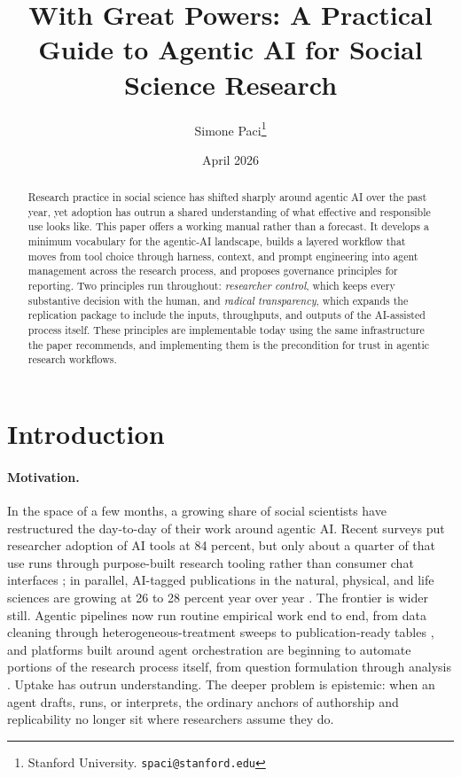 \documentclass[11pt]{article}
\title{With Great Powers: A Practical Guide to Agentic AI for Social Science Research}
\author{Simone Paci\thanks{Stanford University. \texttt{spaci@stanford.edu}}}
\date{April 2026}
\begin{document}
\maketitle

\begin{abstract}
Research practice in social science has shifted sharply around agentic AI over the past year, yet adoption has outrun a shared understanding of what effective and responsible use looks like. This paper offers a working manual rather than a forecast. It develops a minimum vocabulary for the agentic-AI landscape, builds a layered workflow that moves from tool choice through harness, context, and prompt engineering into agent management across the research process, and proposes governance principles for reporting. Two principles run throughout: \emph{researcher control}, which keeps every substantive decision with the human, and \emph{radical transparency}, which expands the replication package to include the inputs, throughputs, and outputs of the AI-assisted process itself. These principles are implementable today using the same infrastructure the paper recommends, and implementing them is the precondition for trust in agentic research workflows.
\end{abstract}

\section{Introduction}
\label{sec:intro}

\paragraph{Motivation.}
In the space of a few months, a growing share of social scientists have restructured the day-to-day of their work around agentic AI. Recent surveys put researcher adoption of AI tools at 84 percent, but only about a quarter of that use runs through purpose-built research tooling rather than consumer chat interfaces \citep{wiley2025adoption}; in parallel, AI-tagged publications in the natural, physical, and life sciences are growing at 26 to 28 percent year over year \citep{hai2026aiindex}. The frontier is wider still. Agentic pipelines now run routine empirical work end to end, from data cleaning through heterogeneous-treatment sweeps to publication-ready tables \citep{pepinsky2026agentic}, and platforms built around agent orchestration are beginning to automate portions of the research process itself, from question formulation through analysis \citep{sresearcher2026}. Uptake has outrun understanding. The deeper problem is epistemic: when an agent drafts, runs, or interprets, the ordinary anchors of authorship and replicability no longer sit where researchers assume they do.
\end{document}
